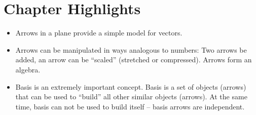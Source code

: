 \section*{Chapter Highlights}
{\chhc
  \it
\begin{itemize}
\item Arrows in a plane provide a simple model for vectors.
\item Arrows can be manipulated in ways analogous to numbers: Two arrows
  be added, an arrow can be ``scaled'' (stretched or compressed). Arrows form
  an algebra.
\item Basis is an extremely important concept. Basis is a set of
  objects (arrows) that can be used to ``build'' all other similar
  objects (arrows). At the same time, basis can not be used to build
  itself -- basis arrows are independent.
\end{itemize}
}

